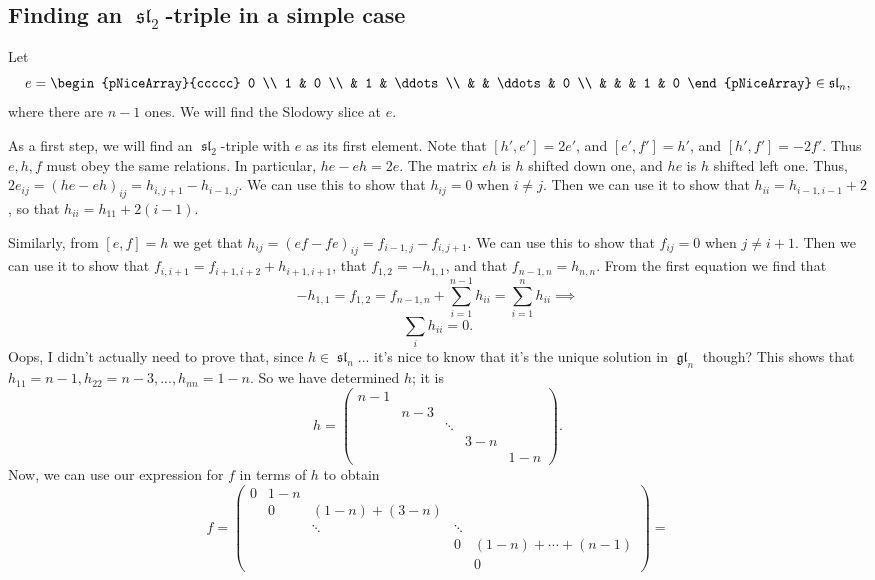 \documentclass[12pt,psamsfonts]{article}
\DeclareMathOperator{\gl}{\mathfrak{gl}}
\DeclareMathOperator{\spl}{\mathfrak{sl}}
\begin{document}
\subsection{Finding an \(\spl_2\)-triple in a simple case}
\par Let
\[e = \begin{pNiceArray}{ccccc}
 0 \\
    1 & 0 \\
  & 1 & \ddots \\
   & & \ddots & 0 \\
   &   &  & 1 & 0
   \end{pNiceArray} \in \mathfrak{sl}_{n},\]
where there are \(n - 1\) ones.
We will find the Slodowy slice at \(e\).
\par As a first step, we will find an \(\spl_2\)-triple with \(e\) as its first element.
Note that \([h', e'] = 2e'\), and \([e', f'] = h'\), and \([h', f'] = -2f'\).
Thus \(e, h, f\) must obey the same relations.
In particular, \(he - eh = 2e\).  
The matrix \(eh\) is \(h\) shifted down one, and \(he\) is \(h\) shifted left one.
Thus, \(2e_{ij} = (he - eh)_{ij} = h_{i, j + 1} - h_{i - 1, j}\).
We can use this to show that \(h_{ij} = 0\) when \(i \neq j\).
Then we can use it to show that \(h_{ii} = h_{i - 1, i - 1} + 2\), so that \(h_{ii} = h_{11} + 2(i - 1)\).
\par Similarly, from \([e, f] = h\) we get that \(h_{ij} = (ef - fe)_{ij} = f_{i - 1, j} - f_{i, j + 1}\).
We can use this to show that \(f_{ij} = 0\) when \(j \neq i + 1\).
Then we can use it to show that \(f_{i,i + 1} = f_{i + 1, i + 2} + h_{i + 1, i + 1}\), that \(f_{1,2} = -h_{1, 1}\), and that \(f_{n - 1, n} = h_{n,n}\).
From the first equation we find that
\[-h_{1,1} = f_{1, 2} = f_{n - 1, n} + \sum_{i = 1}^{n - 1} h_{ii} = \sum_{i = 1}^{n} h_{ii} \implies\]
\[\sum_i h_{ii} = 0.\]
Oops, I didn't actually need to prove that, since \(h \in \spl_n\)... it's nice to know that it's the unique solution in \(\gl_n\) though?
This shows that \(h_{11} = n - 1, h_{22} = n - 3, ..., h_{nn} = 1 - n\).
So we have determined \(h\); it is 
\[h = \begin{pmatrix}
    n - 1  & \\
    & n - 3 \\
    & & \ddots \\
    & & & 3 - n \\
    & & & & 1 - n 
\end{pmatrix}.\]
Now, we can use our expression for \(f\) in terms of \(h\) to obtain
\[f = \begin{pmatrix}
    0 & 1 - n \\
    & 0 & (1 - n) + (3 - n) \\
    & & \ddots & \ddots \\
    & & & 0 & (1 - n) + \cdots + (n - 1) \\
    & & & & 0
\end{pmatrix} = \]
\end{document}
